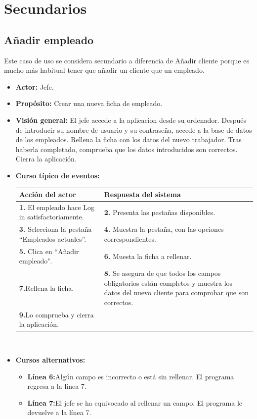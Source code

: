 \documentclass[spanish,a4paper,11pt, twoside]{report}	%
\begin{document}
\section{Secundarios}	


	\subsection{Añadir empleado}	
	Este caso de uso se considera secundario a diferencia de Añadir cliente porque es mucho más habitual tener que añadir un cliente que un empleado.
			\begin{itemize}
			\item \textbf{Actor:} Jefe.
			\item \textbf{Propósito:} Crear una nueva ficha de empleado.
			\item \textbf{Visión general:} El jefe accede a la aplicacion desde su ordenador. Después de introducir su nombre de usuario y su contraseña, accede a la base de datos de los empleados. Rellena la ficha con los datos del nuevo trabajador. Tras haberla completado, comprueba que los datos introducidos son correctos. Cierra la aplicación. 
			\item \textbf{Curso típico de eventos:} 	\\
				\begin{tabular}{|p{6cm}||p{6cm}|}
				\hline
				\textbf{Acción del actor} & \textbf{Respuesta del sistema} \\ \hline \hline
				\textbf{1.}   El empleado hace Log in satisfactoriamente. & \textbf{2.} Presenta las pestañas disponibles.\\ \hline
				\textbf{3.} Selecciona la pestaña “Empleados actuales”. & \textbf{4.} Muestra la pestaña, con las opciones correspondientes. \\ \hline
				\textbf{5.} Clica en “Añadir empleado".	& \textbf{6.} Muesta la ficha a rellenar. \\ \hline
				\textbf{7.}Rellena la ficha. & \textbf{8.} Se asegura de que todos los campos obligatorios están completos y muestra los datos del nuevo cliente para comprobar que son correctos.\\ \hline
				\textbf{9.}Lo comprueba y cierra la aplicación. & \textbf{} \\ \hline
			\end{tabular}
			\\
			\item \textbf{Cursos alternativos:} 
			\begin{itemize}
			\item  \textbf{Línea 6:}Algún campo es incorrecto o está sin rellenar. El programa regresa a la línea 7.
			\item  \textbf{Línea 7:}El jefe se ha equivocado al rellenar un campo. El programa le devuelve a la línea 7.
			\end {itemize}
		\end{itemize}
\end{document}
